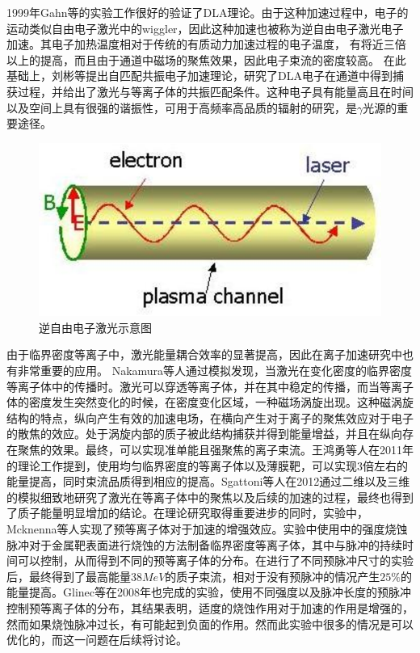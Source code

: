 1999年Gahn等\cite{gahn1999multi}的实验工作很好的验证了DLA理论。由于这种加速过程中，电子的运动类似自由电子激光中的wiggler，因此这种加速也被称为逆自由电子激光电子加速。其电子加热温度相对于传统的有质动力加速过程的电子温度， 有将近三倍以上的提高，而且由于通道中磁场的聚焦效果，因此电子束流的密度较高。
在此基础上，刘彬等提出自匹配共振电子加速理论，研究了DLA电子在通道中得到捕获过程，并给出了激光与等离子体的共振匹配条件。这种电子具有能量高且在时间以及空间上具有很强的谐振性，可用于高频率高品质的辐射的研究，是$\gamma$光源的重要途径。
\begin{figure}[!htbp]
  \centering
  \includegraphics[width=\MyFactor\textwidth]{Img/IFEL.eps}
  \caption{逆自由电子激光示意图}
  \label{fig:IFEL}
\end{figure}
由于临界密度等离子中，激光能量耦合效率的显著提高，因此在离子加速研究中也有非常重要的应用。 Nakamura等人通过模拟发现，当激光在变化密度的临界密度等离子体中的传播时。激光可以穿透等离子体，并在其中稳定的传播，而当等离子体的密度发生突然变化的时候，在密度变化区域，一种磁场涡旋出现。这种磁涡旋结构的特点，纵向产生有效的加速电场，在横向产生对于离子的聚焦效应对于电子的散焦的效应。处于涡旋内部的质子被此结构捕获并得到能量增益，并且在纵向存在聚焦的效果。最终，可以实现准单能且强聚焦的离子束流。王鸿勇等人\cite{wang2011high}在2011年的理论工作提到，使用均匀临界密度的等离子体以及薄膜靶，可以实现3倍左右的能量提高，同时束流品质得到相应的提高。Sgattoni等人\cite{sgattoni2012laser}在2012通过二维以及三维的模拟细致地研究了激光在等离子体中的聚焦以及后续的加速的过程，最终也得到了质子能量明显增加的结论。在理论研究取得重要进步的同时，实验中，Mcknenna等人实现了预等离子体对于加速的增强效应。实验中使用中的强度烧蚀脉冲对于金属靶表面进行烧蚀的方法制备临界密度等离子体，其中与脉冲的持续时间可以控制，从而得到不同的预等离子体的分布。在进行了不同预脉冲尺寸的实验后，最终得到了最高能量38$MeV$的质子束流，相对于没有预脉冲的情况产生$25 \%$的能量提高。Glinec等\cite{glinec2008evolution}在2008年也完成的实验，使用不同强度以及脉冲长度的预脉冲控制预等离子体的分布，其结果表明，适度的烧蚀作用对于加速的作用是增强的，然而如果烧蚀脉冲过长，有可能起到负面的作用。然而此实验中很多的情况是可以优化的，而这一问题在后续将讨论。



